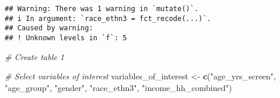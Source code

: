 \documentclass[
]{article}
\newenvironment{Shaded}{\begin{snugshade}}{\end{snugshade}}
\newcommand{\CommentTok}[1]{\textcolor[rgb]{0.56,0.35,0.01}{\textit{#1}}}
\newcommand{\FunctionTok}[1]{\textcolor[rgb]{0.13,0.29,0.53}{\textbf{#1}}}
\newcommand{\NormalTok}[1]{#1}
\newcommand{\OtherTok}[1]{\textcolor[rgb]{0.56,0.35,0.01}{#1}}
\newcommand{\StringTok}[1]{\textcolor[rgb]{0.31,0.60,0.02}{#1}}
\begin{document}
\begin{verbatim}
## Warning: There was 1 warning in `mutate()`.
## i In argument: `race_ethn3 = fct_recode(...)`.
## Caused by warning:
## ! Unknown levels in `f`: 5
\end{verbatim}

\begin{Shaded}
\begin{Highlighting}[]
\CommentTok{\# Create table 1}

\CommentTok{\# Select variables of interest}
\NormalTok{variables\_of\_interest }\OtherTok{\textless{}{-}} \FunctionTok{c}\NormalTok{(}\StringTok{"age\_yrs\_screen"}\NormalTok{, }\StringTok{"age\_group"}\NormalTok{, }\StringTok{"gender"}\NormalTok{, }\StringTok{"race\_ethn3"}\NormalTok{, }\StringTok{"income\_hh\_combined"}\NormalTok{)}


\end{Highlighting}
\end{Shaded}
\end{document}
